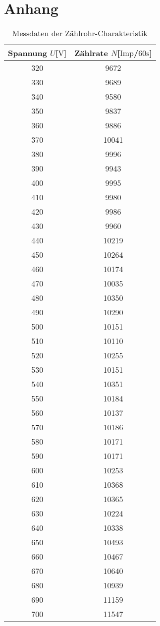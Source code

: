 \section{Anhang}
\begin{table}
\centering
\caption{Messdaten der Zählrohr-Charakteristik}
\label{tab:ogemessdaten}
\begin{tabular}{c c}
    \toprule
    Spannung $U$[$\si{\volt}$] & Zählrate $N$[$\text{Imp}$/$60\si{\second}$]\\
    \midrule
    320	& 9672 \\
    330	& 9689  \\
    340	& 9580  \\
    350	& 9837  \\
    360	& 9886  \\
    370	& 10041 \\
    380	& 9996\\
    390	& 9943\\
    400	& 9995\\
    410	& 9980\\
    420	& 9986\\
    430	& 9960\\
    440	& 10219\\
    450	& 10264\\
    460	& 10174\\
    470	& 10035\\
    480	& 10350\\
    490	& 10290\\
    500	& 10151\\
    510	& 10110\\
    520	& 10255\\
    530	& 10151\\
    540	& 10351\\
    550	& 10184\\
    560	& 10137\\
    570	& 10186\\
    580	& 10171\\
    590	& 10171\\
    600	& 10253\\
    610	& 10368\\
    620	& 10365\\
    630	& 10224\\
    640	& 10338\\
    650	& 10493\\
    660	& 10467\\
    670	& 10640\\
    680	& 10939\\
    690	& 11159\\
    700	& 11547\\
    \bottomrule
\end{tabular}
\end{table}

